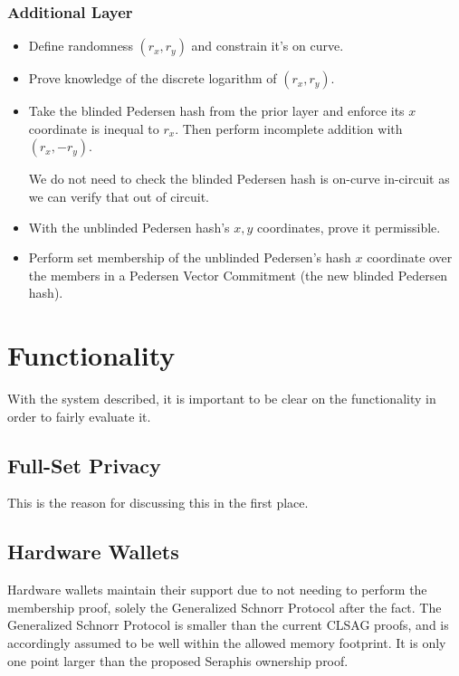 \documentclass[]{article}
\begin{document}
\subsubsection{Additional Layer}

\begin{itemize}
	\item Define randomness $(r_x, r_y)$ and constrain it's on curve.
	\item Prove knowledge of the discrete logarithm of $(r_x, r_y)$.
	\item Take the blinded Pedersen hash from the prior layer and enforce its $x$ coordinate is inequal to $r_x$. Then perform incomplete addition with $(r_x, -r_y)$.
	
	We do not need to check the blinded Pedersen hash is on-curve in-circuit as we can verify that out of circuit.
	\item With the unblinded Pedersen hash's $x, y$ coordinates, prove it permissible.
	\item Perform set membership of the unblinded Pedersen's hash $x$ coordinate over the members in a Pedersen Vector Commitment (the new blinded Pedersen hash).
\end{itemize}

\newpage

\section{Functionality}

With the system described, it is important to be clear on the functionality in order to fairly evaluate it.

\subsection{Full-Set Privacy}

This is the reason for discussing this in the first place.

\subsection{Hardware Wallets}

Hardware wallets maintain their support due to not needing to perform the membership proof, solely the Generalized Schnorr Protocol after the fact. The Generalized Schnorr Protocol is smaller than the current CLSAG proofs, and is accordingly assumed to be well within the allowed memory footprint. It is only one point larger than the proposed Seraphis ownership proof.
\end{document}
